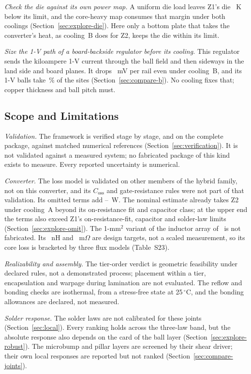 \emph{Check the die against its own power map.} A uniform die load leaves Z1's die
\WrDieMarginAZone~K below its limit, and the core-heavy map consumes that margin under both
coolings (Section~\ref{sec:explore-die}). Here only a bottom plate that takes the converter's heat,
as cooling~B does for Z2, keeps the die within its limit.

\emph{Size the 1-V path of a board-backside regulator before its cooling.} This regulator sends the
kiloampere 1-V current through the ball field and then sideways in the land side and board planes.
It drops \VdropBZthree~mV per rail even under cooling~B, and its 1-V balls take \WrBgaFracZthree\,\%
of the sites (Section~\ref{sec:compare-b}). No cooling fixes that; copper thickness and ball pitch
must.

\subsection{Scope and Limitations}\label{sec:limits}
\emph{Validation.} The framework is verified stage by stage, and on the complete package, against
matched numerical references (Section~\ref{sec:verification}). It is not validated against a
measured system; no fabricated package of this kind exists to measure. Every reported uncertainty
is numerical.

\emph{Converter.} The loss model is validated on other members of the hybrid family, not on this
converter, and its $C_{\mathrm{oss}}$ and gate-resistance rules were not part of that validation.
Its omitted terms add \WrOmitLo--\WrOmitHi~W. The nominal estimate already takes Z2 under
cooling~A beyond its on-resistance fit and capacitor class; at the upper end the terms also exceed
Z1's on-resistance-fit, capacitor and solder-law limits (Section~\ref{sec:explore-omit}). The 1-mm$^2$
variant of the inductor array of~\cite{Rasheedi2026CoupledInductor} is not fabricated. Its
\FrConvIndL~nH and \FrConvIndDcr~m$\Omega$ are design targets, not a scaled measurement, so its core
loss is bracketed by three flux models (Table~S23).

\emph{Realizability and assembly.} The tier-order verdict is geometric feasibility under declared
rules, not a demonstrated process; placement within a tier, encapsulation and warpage during
lamination are not evaluated. The reflow and bonding checks are isothermal, from a stress-free
state at 25\,$^\circ$C, and the bonding allowances are declared, not measured.

\emph{Solder response.} The solder laws are not calibrated for these joints
(Section~\ref{sec:local}). Every ranking holds across the three-law band, but the absolute response
also depends on the card of the ball layer (Section~\ref{sec:explore-robust}). The microbump and
pillar layers are screened by their shear driver; their own local responses are reported but not
ranked (Section~\ref{sec:compare-joints}).

